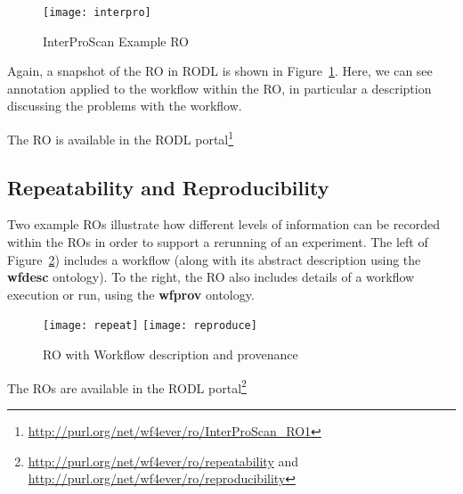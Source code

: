 \begin{figure}[ht]
  \centering
  \texttt{[image: interpro]}
  \caption{InterProScan Example RO}
  \label{fig:interpro}
\end{figure}

Again, a snapshot of the RO in RODL is shown in
Figure~\ref{fig:interpro}. Here, we can see annotation applied to the
workflow within the RO, in particular a description discussing the
problems with the workflow. 

The RO is available in the RODL portal\footnote{\url{http://purl.org/net/wf4ever/ro/InterProScan_RO1}}

\subsection{Repeatability and Reproducibility}

Two example ROs illustrate how different levels of information can be
recorded within the ROs in order to support a rerunning of an
experiment. The left of Figure~\ref{fig:repeat}) includes a workflow
(along with its abstract description using the \textbf{wfdesc}
ontology). To the right, the RO also includes details of a workflow
execution or run, using the \textbf{wfprov} ontology.

\begin{figure}[ht]
  \centering
  \texttt{[image: repeat]}
  \texttt{[image: reproduce]}
  \caption{RO with Workflow description and provenance}
  \label{fig:repeat}
\end{figure}

The ROs are available in the RODL
portal\footnote{\url{http://purl.org/net/wf4ever/ro/repeatability} and
  \url{http://purl.org/net/wf4ever/ro/reproducibility}}
